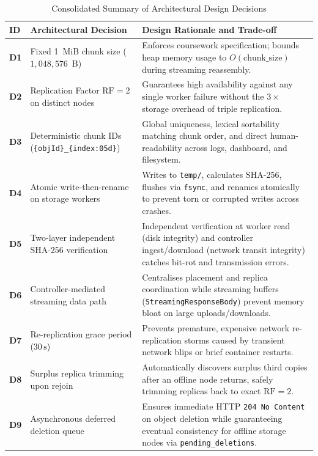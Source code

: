 \documentclass[12pt,a4paper]{report}
\begin{document}
\begin{table}[H]
  \centering
  \small
  \caption{Consolidated Summary of Architectural Design Decisions}
  \label{tab:design}
  \begin{tabularx}{\textwidth}{>{\bfseries}l p{4.2cm} X}
    \toprule
    \textbf{ID} & \textbf{Architectural Decision} & \textbf{Design Rationale and Trade-off} \\
    \midrule
    D1  & Fixed 1~MiB chunk size ($1,048,576$~B) & Enforces coursework specification; bounds heap memory usage to $O(\text{chunk\_size})$ during streaming reassembly. \\
    \addlinespace
    D2  & Replication Factor $\text{RF} = 2$ on distinct nodes & Guarantees high availability against any single worker failure without the $3\times$ storage overhead of triple replication. \\
    \addlinespace
    D3  & Deterministic chunk IDs (\texttt{\{objId\}\_\{index:05d\}}) & Global uniqueness, lexical sortability matching chunk order, and direct human-readability across logs, dashboard, and filesystem. \\
    \addlinespace
    D4  & Atomic write-then-rename on storage workers & Writes to \texttt{temp/}, calculates SHA-256, flushes via \texttt{fsync}, and renames atomically to prevent torn or corrupted writes across crashes. \\
    \addlinespace
    D5  & Two-layer independent SHA-256 verification & Independent verification at worker read (disk integrity) and controller ingest/download (network transit integrity) catches bit-rot and transmission errors. \\
    \addlinespace
    D6  & Controller-mediated streaming data path & Centralises placement and replica coordination while streaming buffers (\texttt{StreamingResponseBody}) prevent memory bloat on large uploads/downloads. \\
    \addlinespace
    D7  & Re-replication grace period ($30\,\text{s}$) & Prevents premature, expensive network re-replication storms caused by transient network blips or brief container restarts. \\
    \addlinespace
    D8  & Surplus replica trimming upon rejoin & Automatically discovers surplus third copies after an offline node returns, safely trimming replicas back to exact $\text{RF} = 2$. \\
    \addlinespace
    D9  & Asynchronous deferred deletion queue & Ensures immediate HTTP \texttt{204 No Content} on object deletion while guaranteeing eventual consistency for offline storage nodes via \texttt{pending\_deletions}. \\

\end{tabularx}
\end{table}
\end{document}
